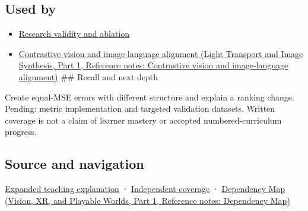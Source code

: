 \subsection{Used by}\label{appendix-b2c1846508bf-used-by}

\hypertarget{appendix-b2c1846508bf-used-by}{}

\begin{itemize}
\item
  \hyperref[appendix-65788587ef78]{Research validity and ablation}
\item
  \href{../04-Light-Transport-and-Image-Synthesis-P01/main.pdf\#nameddest=appendix-772f1fd96148}{Contrastive vision and image-language alignment (Light Transport and Image Synthesis, Part 1, Reference notes: Contrastive vision and image-language alignment)} \#\# Recall and next depth
\end{itemize}

Create equal-MSE errors with different structure and explain a ranking change. Pending: metric implementation and targeted validation datasets. Written coverage is not a claim of learner mastery or accepted numbered-curriculum progress.

\subsection{Source and navigation}\label{appendix-b2c1846508bf-source-and-navigation}

\hypertarget{appendix-b2c1846508bf-source-and-navigation}{}

\hyperref[04-visual-computing-ii-ch042-quality-numbers-need-a-question-they-can-actually-answer]{Expanded teaching explanation} · \hyperref[appendix-fd090d982a15-xr01---independent-seeing-and-representation-source]{Independent coverage} · \href{../07-Vision-XR-and-Playable-Worlds-P01/main.pdf\#nameddest=appendix-4ad47bdd269a}{Dependency Map (Vision, XR, and Playable Worlds, Part 1, Reference notes: Dependency Map)}
